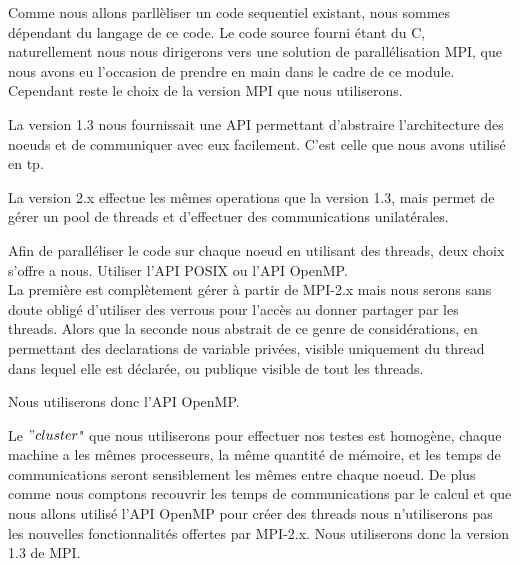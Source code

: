 \par Comme nous allons parllèliser un code sequentiel existant,
nous sommes dépendant du langage de ce code. Le code source fourni 
étant du C, naturellement nous nous dirigerons vers une solution 
de parallélisation MPI, que nous avons eu l'occasion de prendre 
en main dans le cadre de ce module. Cependant reste le choix de la 
version MPI que nous utiliserons.\\
\par La version 1.3 nous fournissait une API permettant d'abstraire 
l'architecture des noeuds et de communiquer avec eux facilement. C'est
celle que nous avons utilisé en tp.\\
\par La version 2.x effectue les mêmes operations que la version 1.3,
mais permet de gérer un pool de threads et d'effectuer des communications
unilatérales.\\
\par Afin de paralléliser le code sur chaque noeud en utilisant des threads,
deux choix s'offre a nous.
Utiliser l'API POSIX ou l'API  OpenMP.\\
La première est complètement gérer à partir de MPI-2.x mais nous serons sans doute
obligé d'utiliser des verrous pour l'accès au donner partager par les threads.
Alors que la seconde nous abstrait de ce genre de considérations, en permettant 
des declarations de variable privées, visible uniquement du thread dans lequel elle
est déclarée, ou publique visible de tout les threads.\\

\par Nous utiliserons donc l'API OpenMP.\\

\par Le $"cluster$" que nous utiliserons pour effectuer nos testes 
est homogène, chaque machine a les mêmes processeurs, la même 
quantité de mémoire, et les temps de communications seront sensiblement 
les mêmes entre chaque noeud. De plus comme nous comptons recouvrir les temps de communications
par le calcul et que nous allons utilisé l'API OpenMP  pour créer des
threads nous n'utiliserons pas les nouvelles fonctionnalités offertes
par MPI-2.x. Nous utiliserons donc la version 1.3 de MPI.\\